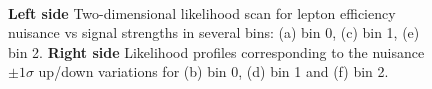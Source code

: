 \begin{figure}[htb]
\\

\caption{{\bf Left side} Two-dimensional likelihood scan for lepton efficiency nuisance vs signal strengths in several bins: (a) bin 0, (c) bin 1, (e) bin 2. {\bf Right side} Likelihood profiles corresponding to the nuisance $\pm 1 \sigma$ up/down variations for (b) bin 0, (d) bin 1 and (f) bin 2.\label{fig:eff_l_bananas_p1}}
\end{figure}


